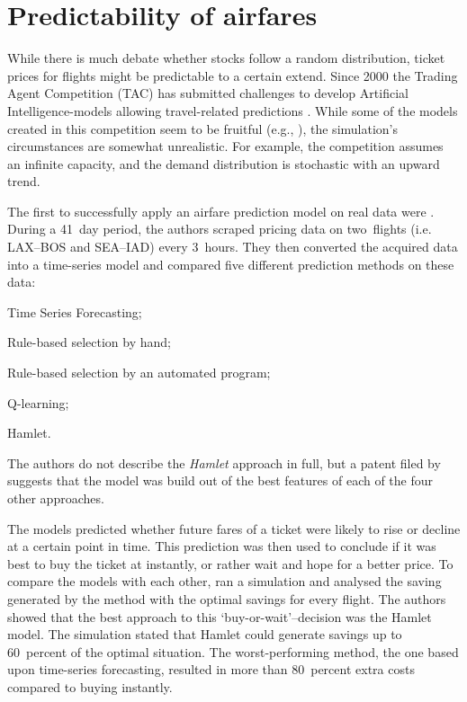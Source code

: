 \section{Predictability of airfares}
\label{sec:PredictabilityOfAirfares}
While there is much debate whether stocks follow a random distribution, ticket prices for flights might be predictable to a certain extend. Since 2000 the Trading Agent Competition (TAC) has submitted challenges to develop Artificial Intelligence-models allowing travel-related predictions . While some of the models created in this competition seem to be fruitful (e.g., ), the simulation's circumstances are somewhat unrealistic. For example, the competition assumes an infinite capacity, and the demand distribution is stochastic with an upward trend.

The first to successfully apply an airfare prediction model on real data were . During a 41~day period, the authors scraped pricing data on two~flights (i.e. LAX--BOS and SEA--IAD) every 3~hours. They then converted the acquired data into a time-series model and compared five different prediction methods on these data:
\begin{inparaenum}
\item Time Series Forecasting;
\item Rule-based selection by hand;
\item Rule-based selection by an automated program;
\item Q-learning;
\item Hamlet.
\end{inparaenum}

The authors do not describe the \emph{Hamlet} approach in full, but a patent filed by  suggests that the model was build out of the best features of each of the four other approaches.

The models predicted whether future fares of a ticket were likely to rise or decline at a certain point in time. This prediction was then used to conclude if it was best to buy the ticket at instantly, or rather wait and hope for a better price. To compare the models with each other,  ran a simulation and analysed the saving generated by the method with the optimal savings for every flight. The authors showed that the best approach to this `buy-or-wait'--decision was the Hamlet model. The simulation stated that Hamlet could generate savings up to 60~percent of the optimal situation. The worst-performing method, the one based upon time-series forecasting, resulted in more than 80~percent extra costs compared to buying instantly.

